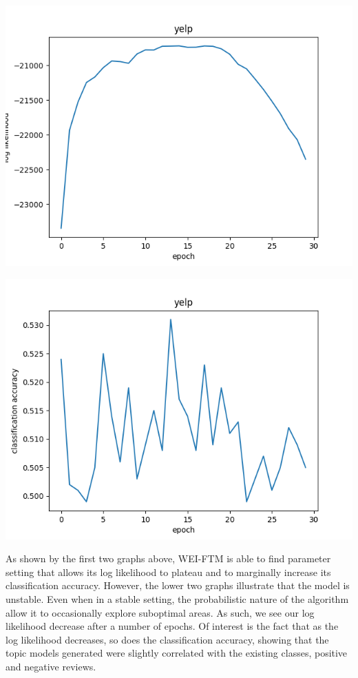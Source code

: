 \documentclass[letterpaper, 11pt]{article}
\begin{document}
\begin{multicols}{2}
\begin{center}
\includegraphics[scale=.3]{yelp_log_like_long}
\end{center}

\begin{center}
\includegraphics[scale=.3]{yelp_acc_long}
\end{center}


As shown by the first two graphs above, WEI-FTM is able to find parameter setting that allows its
log likelihood to plateau and to marginally increase its classification accuracy.
However, the lower two graphs illustrate that the model is unstable.
Even when in a stable setting, the probabilistic nature of the algorithm allow it to occasionally
explore suboptimal areas.
As such, we see our log likelihood decrease after a number of epochs.
Of interest is the fact that as the log likelihood decreases, so does the classification accuracy,
showing that the topic models generated were slightly correlated with the existing classes,
positive and negative reviews.


\end{multicols}
\end{document}
